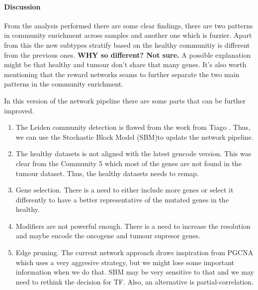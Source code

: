 \paragraph{Discussion}
From the analysis performed there are some clear findings, there are two patterns in community enrichment across samples and another one which is fuzzier. Apart from this the new subtypes stratify based on the healthy communitiy is different from the previous ones. \textbf{WHY so different? Not sure.} A possible explanation might be that healthy and tumour don't share that many genes. It's also worth mentioning that the reward networks seams to further separate the two main patterns in the community enrichment.

In this version of the network pipeline there are some parts that can be further improved.
\begin{enumerate}
    \item The Leiden community detection is flawed from the work from Tiago \cite{Peixoto2021-jx,Fortunato2016-tj}. Thus, we can use the Stochastic Block Model (SBM)\cite{Peixoto2017-ua}to update the network pipeline.
    \item The healthy datasets is not aligned with the latest gencode version. This was clear from the Community 5 which most of the genes are not found in the tumour dataset. Thus, the healthy datasets needs to remap.
    \item Gene selection. There is a need to either include more genes or select it differently to have a better representative of the mutated genes in the healthy.
    \item Modifiers are not powerful enough. There is a need to increase the resolution and maybe encode the oncogene and tumour supresor genes.
    \item Edge pruning. The current network approach draws inspiration from PGCNA which uses a very aggresive strategy, but we might lose some important information when we do that. SBM may be very sensitive to that and we may need to rethink the decision for TF. Also, an alternative is partial-correlation.
\end{enumerate}



